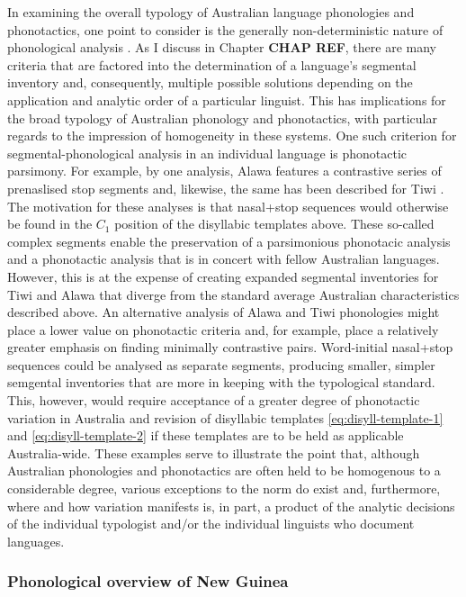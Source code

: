 In examining the overall typology of Australian language phonologies and phonotactics, one point to consider is the generally non-deterministic nature of phonological analysis \autocites{chao_non-uniqueness_1934}{hockett_problem_1963}{hyman_universals_2008}{dresher_contrastive_2009}. As I discuss in Chapter \textbf{CHAP REF}, there are many criteria that are factored into the determination of a language's segmental inventory and, consequently, multiple possible solutions depending on the application and analytic order of a particular linguist. This has implications for the broad typology of Australian phonology and phonotactics, with particular regards to the impression of homogeneity in these systems. One such criterion for segmental-phonological analysis in an individual language is phonotactic parsimony. For example, by one analysis, Alawa features a contrastive series of prenaslised stop segments \autocite{sharpe_alawa_1972} and, likewise, the same has been described for Tiwi \autocite{lee_tiwi_1987}. The motivation for these analyses is that nasal+stop sequences would otherwise be found in the \(C_1\) position of the disyllabic templates above. These so-called complex segments enable the preservation of a parsimonious phonotacic analysis and a phonotactic analysis that is in concert with fellow Australian languages. However, this is at the expense of creating expanded segmental inventories for Tiwi and Alawa that diverge from the standard average Australian characteristics described above. An alternative analysis of Alawa and Tiwi phonologies might place a lower value on phonotactic criteria and, for example, place a relatively greater emphasis on finding minimally contrastive pairs. Word-initial nasal+stop sequences could be analysed as separate segments, producing smaller, simpler semgental inventories that are more in keeping with the typological standard. This, however, would require acceptance of a greater degree of phonotactic variation in Australia and revision of disyllabic templates \eqref{eq:disyll-template-1} and \eqref{eq:disyll-template-2} if these templates are to be held as applicable Australia-wide. These examples serve to illustrate the point that, although Australian phonologies and phonotactics are often held to be homogenous to a considerable degree, various exceptions to the norm do exist and, furthermore, where and how variation manifests is, in part, a product of the analytic decisions of the individual typologist and/or the individual linguists who document languages.

\hypertarget{phonological-overview-of-new-guinea}{%
\subsubsection{Phonological overview of New Guinea}\label{phonological-overview-of-new-guinea}}

